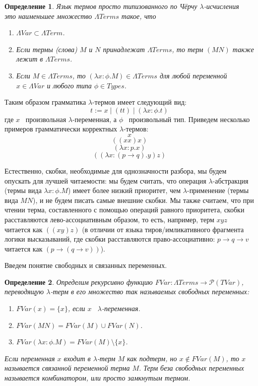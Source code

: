 \documentclass{article}[12pt]
\newtheorem{definition}{Определение}
\newcommand{\dash}{\textemdash\ }
\begin{document}
\begin{definition}
    Язык термов просто типизованного по Чёрчу $\lambda$-исчисления \dash
    это наименьшее множество $\Lambda Terms$ такое, что
    \begin{enumerate}
        \item $\Lambda Var \subset \Lambda Term$.
        \item Если термы (слова) $M$ и $N$ принадлежат $\Lambda Terms$, то терм
        $(MN)$ также лежит в $\Lambda Terms$.
        \item Если $M \in \Lambda Terms$, то $(\lambda x : \phi . M) \in \Lambda Terms$
        для любой переменной $x \in \Lambda Var$ и любого типа $\phi \in Types$.
    \end{enumerate}
\end{definition}
Таким образом грамматика $\lambda$-термов имеет следующий вид:
$$t := x \; | \; (tt) \; | \; (\lambda x : \phi . t)$$
где $x$ \dash произвольная $\lambda$-переменная, а $\phi$ \dash произвольный тип.
Приведем несколько примеров грамматически корректных $\lambda$-термов:
$$x$$
$$((xx)x)$$
$$(\lambda x : p . x)$$
$$((\lambda x : (p \rightarrow q).y)z)$$

Естественно, скобки, необходимые для однозначности разбора, мы будем опускать для лучшей читаемости:
мы будем считать, что операция $\lambda$-абстракция (термы вида $\lambda x : \phi . M$) имеет более
низкий приоритет, чем $\lambda$-применение (термы вида $MN$), и не будем писать самые внешние скобки.
Мы также считаем, что при чтении терма, составленного с помощью операций равного приоритета,
скобки расставляются лево-ассоциативным образом, то есть, например, терм $xyz$ читается как $((xy)z)$
(в отличии от языка тиров/имликативного фрагмента логики высказываний, где скобки расставляются
право-ассоциативно: $p \rightarrow q \rightarrow v$ читается как $(p \rightarrow (q \rightarrow v))$).

Введем понятие свободных и связанных переменных.
\begin{definition}
    Определим рекурсивно функцию $FVar : \Lambda Terms \rightarrow \mathcal{P}(TVar)$,
    переводящую $\lambda$-терм в его множество так называемых свободных переменных:
    \begin{enumerate}
        \item $FVar(x) = \{ x \}$, если $x$ \dash $\lambda$-переменная.
        \item $FVar(MN) = FVar(M) \cup FVar(N)$.
        \item $FVar(\lambda x : \phi . M) = FVar(M) \setminus \{ x \}$.
    \end{enumerate}
    Если переменная $x$ входит в $\lambda$-терм $M$ как подтерм, но $x \not \in FVar(M)$, то $x$
    называется связанной переменной терма $M$. Терм беза свободных переменных называется
    комбинатором, или просто замкнутым термом.
\end{definition}
\end{document}
